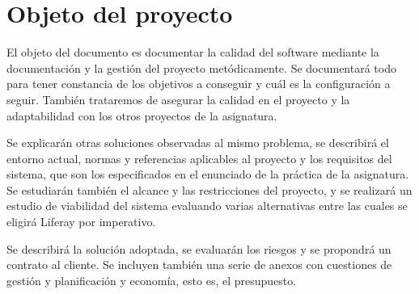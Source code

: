 \section{Objeto del proyecto}

\par El objeto del documento es documentar la calidad del software mediante la documentación y la gestión del proyecto metódicamente. Se documentará todo para tener constancia de los objetivos a conseguir y cuál es la configuración a seguir. También trataremos de asegurar la calidad en el proyecto y la adaptabilidad con los otros proyectos de la asignatura.

\par Se explicarán otras soluciones observadas al mismo problema, se describirá el entorno actual, normas y referencias aplicables al proyecto y los requisitos del sistema, que son los especificados en el enunciado de la práctica de la asignatura. Se estudiarán también el alcance y las restricciones del proyecto, y se realizará un estudio de viabilidad del sistema evaluando varias alternativas entre las cuales se eligirá Liferay por imperativo.

\par Se describirá la solución adoptada, se evaluarán los riesgos y se propondrá un contrato al cliente. Se incluyen también una serie de anexos con cuestiones de gestión y planificación y economía, esto es, el presupuesto.

